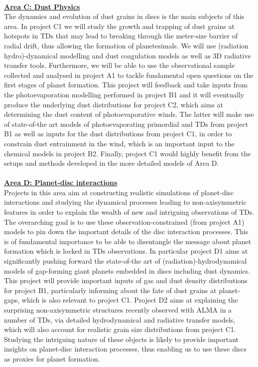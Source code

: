 \documentclass[10pt,fleqn,twoside]{article}
\newcommand{\AreacolC}{\color{YellowOrange}}
\newcommand{\AreacolD}{\color{Red}}
\begin{document}
%
\mbox{}\vspace{1em}\\
\noindent\underline{\bf\AreacolC Area C: Dust Physics}\\
\noindent The dynamics and evolution of dust grains in discs is the
main subjects of this area. In project C1 we will study the growth and
trapping of dust grains at hotspots in TDs that may lead
to breaking through the meter-size barrier of radial drift, thus
allowing the formation of planetesimals. We will use (radiation
hydro)-dynamical modelling and dust coagulation models as well as 3D
radiative transfer tools. Furthermore, we will be able to use the
observational sample collected and analysed in project A1 to tackle
fundamental open questions on the first stages of planet
formation. This project will feedback and take inputs from the
photoevaporation modelling performed in project B1 and it will
eventually produce
the underlying dust distributions for project C2, which aims at
determining the dust content of photoevaporative winds. The latter
will make use of state-of-the art models of photoevaporating
primordial and TDs from project B1 as well as inputs for the dust distributions from
project C1, in order to constrain dust entrainment in the wind, which
is an important input to the chemical models in project B2. Finally,
project C1 would highly benefit from the setups and methods developed
in the more detailed models of Area D.\\ 




\mbox{}\vspace{1em}\\
\noindent\underline{\bf\AreacolD Area D: Planet-disc interactions}\\
\noindent Projects in this area aim at constructing realistic
simulations of planet-disc interactions and studying the dynamical processes
leading to non-axisymmetric features in order to explain the wealth of new
and intriguing observations of TDs. The overarching goal is to use
these observation-constrained (from project A1) models to pin down
the important details of the disc interaction processes. This is of
fundamental importance to be able to disentangle the message about
planet formation which is locked in TDs observations. In particular
project D1 aims at significantly pushing forward the state-of-the art
of (radiation)-hydrodynamical models of gap-forming giant planets
embedded in discs including dust dynamics. 
This project will provide important inputs of
gas and dust density distributions for project B1, particularly informing about the
fate of dust grains at planet-gaps, which is also relevant to project
C1. Project D2 aims at explaining the surprising non-axisymmetric
structures recently observed with ALMA in a number of TDs, via
detailed hydrodynamical and radiative transfer models, which will also
account for realistic grain size distributions from project
C1. Studying the intriguing nature of these objects is likely to
provide important insights on planet-disc interaction processes, thus
enabling us to use these discs as proxies for planet formation.  \\ 
\end{document}
